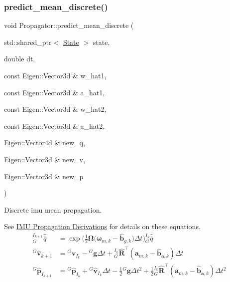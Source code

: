\subsubsection{\texorpdfstring{predict\+\_\+mean\+\_\+discrete()}{predict\_mean\_discrete()}}
{\footnotesize\ttfamily void Propagator\+::predict\+\_\+mean\+\_\+discrete (\begin{DoxyParamCaption}\item[{std\+::shared\+\_\+ptr$<$ \hyperlink{classov__msckf_1_1State}{State} $>$}]{state,  }\item[{double}]{dt,  }\item[{const Eigen\+::\+Vector3d \&}]{w\+\_\+hat1,  }\item[{const Eigen\+::\+Vector3d \&}]{a\+\_\+hat1,  }\item[{const Eigen\+::\+Vector3d \&}]{w\+\_\+hat2,  }\item[{const Eigen\+::\+Vector3d \&}]{a\+\_\+hat2,  }\item[{Eigen\+::\+Vector4d \&}]{new\+\_\+q,  }\item[{Eigen\+::\+Vector3d \&}]{new\+\_\+v,  }\item[{Eigen\+::\+Vector3d \&}]{new\+\_\+p }\end{DoxyParamCaption})\hspace{0.3cm}{\ttfamily [protected]}}



Discrete imu mean propagation. 

See \hyperlink{propagation}{I\+MU Propagation Derivations} for details on these equations. \begin{align*} \text{}^{I_{k+1}}_{G}\hat{\bar{q}} &= \exp\bigg(\frac{1}{2}\boldsymbol{\Omega}\big({\boldsymbol{\omega}}_{m,k}-\hat{\mathbf{b}}_{g,k}\big)\Delta t\bigg) \text{}^{I_{k}}_{G}\hat{\bar{q}} \\ ^G\hat{\mathbf{v}}_{k+1} &= \text{}^G\hat{\mathbf{v}}_{I_k} - {}^G\mathbf{g}\Delta t +\text{}^{I_k}_G\hat{\mathbf{R}}^\top(\mathbf{a}_{m,k} - \hat{\mathbf{b}}_{\mathbf{a},k})\Delta t\\ ^G\hat{\mathbf{p}}_{I_{k+1}} &= \text{}^G\hat{\mathbf{p}}_{I_k} + {}^G\hat{\mathbf{v}}_{I_k} \Delta t - \frac{1}{2}{}^G\mathbf{g}\Delta t^2 + \frac{1}{2} \text{}^{I_k}_{G}\hat{\mathbf{R}}^\top(\mathbf{a}_{m,k} - \hat{\mathbf{b}}_{\mathbf{a},k})\Delta t^2 \end{align*}


